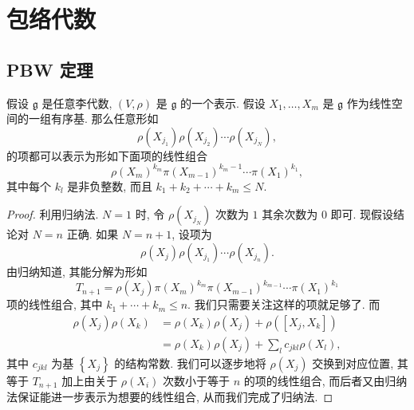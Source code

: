 
\section{包络代数}

\subsection{PBW 定理}

\begin{lemma}[重排引理]
  \label{lemma-reordering}
  假设 \( \mathfrak{g} \) 是任意李代数, \( (V, \rho) \) 是 \( \mathfrak{g} \)
  的一个表示. 假设 \( X_1,\ldots, X_m \) 是 \( \mathfrak{g} \)
  作为线性空间的一组有序基. 那么任意形如
  \[
    \rho(X_{j_1}) \rho(X_{j_2}) \cdots \rho(X_{j_N}),
  \]
  的项都可以表示为形如下面项的线性组合
  \[
    \rho(X_m)^{k_m} \pi(X_{m - 1})^{k_m - 1} \cdots \pi(X_1)^{k_1},
  \]
  其中每个 \( k_l \) 是非负整数, 而且 \( k_1 + k_2 + \cdots + k_m \leq N \).
\end{lemma}
\begin{proof}
  利用归纳法. \( N = 1 \) 时, 令 \( \rho(X_{j_N}) \) 次数为 \( 1 \) 其余次数为
  \( 0 \) 即可. 现假设结论对 \( N = n \) 正确. 如果 \( N = n + 1 \), 设项为
  \[
    \rho(X_j)\rho(X_{j_1}) \cdots \rho(X_{j_n}).
  \]
  由归纳知道, 其能分解为形如
  \[
    T_{n + 1} = \rho(X_j)\pi(X_m)^{k_m} \pi(X_{m - 1})^{k_{m - 1}} \cdots \pi(X_1)^{k_1}
  \]
  项的线性组合, 其中 \( k_1 + \cdots + k_m \leq n \).
  我们只需要关注这样的项就足够了. 而
  \begin{align*}
    \rho(X_j) \rho(X_k) &= \rho(X_k) \rho(X_j) + \rho([X_j, X_k])\\
                        &= \rho(X_k) \rho(X_j) + \sum_{l} c_{jkl} \rho(X_l),
  \end{align*}
  其中 \( c_{jkl} \) 为基 \( \left\lbrace X_j \right\rbrace \) 的结构常数.
  我们可以逐步地将 \( \rho(X_j) \) 交换到对应位置, 其等于 \( T_{n + 1} \)
  加上由关于 \( \rho(X_i) \) 次数小于等于 \( n \) 的项的线性组合,
  而后者又由归纳法保证能进一步表示为想要的线性组合, 从而我们完成了归纳法.
\end{proof}

